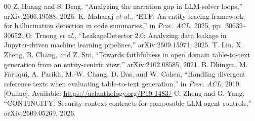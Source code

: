 \documentclass[conference]{IEEEtran}
\begin{document}
\begin{thebibliography}{00}
 Z. Huang and S. Deng, ``Analyzing the narration gap in LLM-solver loops,'' arXiv:2606.19588, 2026.
 K. Maharaj \emph{et al.}, ``ETF: An entity tracing framework for hallucination detection in code summaries,'' in \emph{Proc. ACL}, 2025, pp.~30639--30652.
 O. Truong \emph{et al.}, ``LeakageDetector 2.0: Analyzing data leakage in Jupyter-driven machine learning pipelines,'' arXiv:2509.15971, 2025.
 T. Liu, X. Zheng, B. Chang, and Z. Sui, ``Towards faithfulness in open domain table-to-text generation from an entity-centric view,'' arXiv:2102.08585, 2021.
 B. Dhingra, M. Faruqui, A. Parikh, M.-W. Chang, D. Das, and W. Cohen, ``Handling divergent reference texts when evaluating table-to-text generation,'' in \emph{Proc. ACL}, 2019. [Online]. Available: \url{https://aclanthology.org/P19-1483/}
 C. Zheng and G. Yang, ``CONTINUITY: Security-context contracts for composable LLM agent controls,'' arXiv:2609.05269, 2026.
\end{thebibliography}
\end{document}
